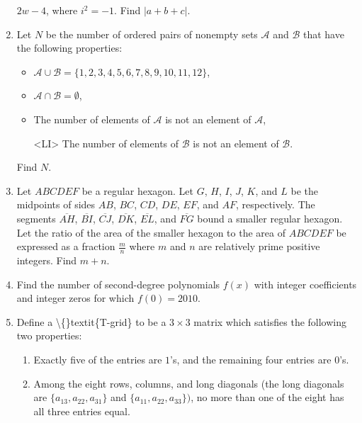 \documentclass{article}
\begin{document}
\begin{enumerate}[label=\arabic*., itemsep=0.5em]
\(2w-4\), where \(i^2=-1\). Find \(|a+b+c|\).\par \vspace{0.5em}\item Let \(N\) be the number of ordered pairs of nonempty sets \(\mathcal{A}\) and \(\mathcal{B}\) that have the following properties:

\begin{itemize}
\item \(\mathcal{A} \cup \mathcal{B} = \{1,2,3,4,5,6,7,8,9,10,11,12\}\),

\item \(\mathcal{A} \cap \mathcal{B} = \emptyset\),

\item The number of elements of \(\mathcal{A}\) is not an element of \(\mathcal{A}\),

<LI> The number of elements of \(\mathcal{B}\) is not an element of \(\mathcal{B}\).
\end{itemize}


Find \(N\).\par \vspace{0.5em}\item Let \(ABCDEF\) be a regular hexagon. Let \(G\), \(H\), \(I\), \(J\), \(K\), and \(L\) be the midpoints of sides \(AB\), \(BC\), \(CD\), \(DE\), \(EF\), and \(AF\), respectively. The segments \(\overline{AH}\), \(\overline{BI}\), \(\overline{CJ}\), \(\overline{DK}\), \(\overline{EL}\), and \(\overline{FG}\) bound a smaller regular hexagon. Let the ratio of the area of the smaller hexagon to the area of \(ABCDEF\) be expressed as a fraction \(\frac {m}{n}\) where \(m\) and \(n\) are relatively prime positive integers. Find \(m + n\).\par \vspace{0.5em}\item Find the number of second-degree polynomials \(f(x)\) with integer coefficients and integer zeros for which \(f(0)=2010\).\par \vspace{0.5em}\item Define a \textbackslash\{\}textit\{T-grid\} to be a \(3\times3\) matrix which satisfies the following two properties:

\begin{enumerate}
\item Exactly five of the entries are \(1\)'s, and the remaining four entries are \(0\)'s.

\item Among the eight rows, columns, and long diagonals (the long diagonals are \(\{a_{13},a_{22},a_{31}\}\) and \(\{a_{11},a_{22},a_{33}\})\), no more than one of the eight has all three entries equal.
\end{enumerate}



\end{enumerate}
\end{document}
